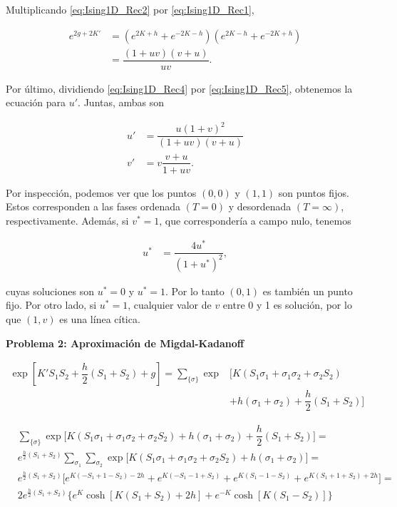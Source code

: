 \documentclass[10pt]{article}
\begin{document}
Multiplicando \ref{eq:Ising1D_Rec2} por  \ref{eq:Ising1D_Rec1},

\begin{align}
e^{2g+2K'} &= (e^{2K+h} + e^{-2K-h}) (e^{2K-h} + e^{-2K+h}) \nonumber \\
&= \dfrac{(1+uv)(v+u)}{uv}. \label{eq:Ising1D_Rec5}
\end{align}

Por \'ultimo, dividiendo \ref{eq:Ising1D_Rec4} por \ref{eq:Ising1D_Rec5}, obtenemos la ecuaci\'on para $u'$. Juntas, ambas son

\begin{align}
u' &= \dfrac{u (1+v)^2}{(1+uv)(v+u)} \\
v' &= v \dfrac{v+u}{1+uv}.
\end{align}

Por inspecci\'on, podemos ver que los puntos $(0,0)$ y $(1,1)$ son puntos fijos. Estos corresponden a las fases ordenada $(T = 0)$ y desordenada $(T = \infty)$, respectivamente. Adem\'as, si $v^*=1$, que corresponder\'ia a campo nulo, tenemos

\begin{align}
u^* &= \dfrac{4u^*}{(1+u^*)^2},
\end{align}

cuyas soluciones son $u^* = 0$ y $u^* = 1$. Por lo tanto $(0,1)$ es tambi\'en un punto fijo. Por otro lado, si $u^* = 1$, cualquier valor de $v$ entre 0 y 1 es soluci\'on, por lo que $(1,v)$ es una l\'inea c\'itica.

\pagebreak

\textbf{Problema 2: Aproximaci\'on de Migdal-Kadanoff}

\begin{align*}
\exp \left[ K' S_1 S_2 + \dfrac{h}{2}\left( S_1 + S_2\right) +g \right] = \sum_{\lbrace \sigma \rbrace} \exp &\bigg[ K(S_1 \sigma_1 + \sigma_1 \sigma_2 + \sigma_2 S_2) \\
&+ h (\sigma_1 + \sigma_2) + \dfrac{h}{2} (S_1 + S_2) \bigg]
\end{align*}

\begin{align*}
&\sum_{\lbrace \sigma \rbrace} \exp \bigg[ K(S_1 \sigma_1 + \sigma_1 \sigma_2 + \sigma_2 S_2) + h (\sigma_1 + \sigma_2) + \dfrac{h}{2} (S_1 + S_2) \bigg] = \\
&e^{\frac{h}{2} (S_1 + S_2)} \sum_{\sigma_1} \sum_{\sigma_2} \exp \bigg[ K(S_1 \sigma_1 + \sigma_1 \sigma_2 + \sigma_2 S_2) + h (\sigma_1 + \sigma_2) \bigg] = \\
&e^{\frac{h}{2} (S_1 + S_2)} \bigg[ e^{K(-S_1 + 1 - S_2) - 2h} + e^{K(-S_1 - 1 +S_2)} + e^{K(S_1 - 1 - S_2)} + e^{K(S_1 + 1 + S_2) + 2h} \bigg] = \\
&2 e^{\frac{h}{2} (S_1 + S_2)}\bigg\lbrace e^{K} \cosh\left[ K(S_1+S_2)+2h \right] + e^{-K} \cosh\left[ K(S_1-S_2) \right] \bigg\rbrace 
\end{align*}
\end{document}
